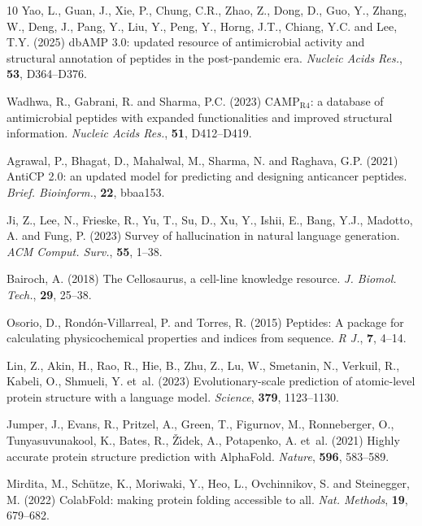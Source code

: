 \documentclass[unnumsec,webpdf,contemporary,large]{oup-authoring-template}%
\begin{document}
\begin{thebibliography}{10}
Yao, L., Guan, J., Xie, P., Chung, C.R., Zhao, Z., Dong, D., Guo, Y., Zhang, W., Deng, J., Pang, Y., Liu, Y., Peng, Y., Horng, J.T., Chiang, Y.C. and Lee, T.Y. (2025)
dbAMP 3.0: updated resource of antimicrobial activity and structural annotation of peptides in the post-pandemic era.
\newblock \emph{Nucleic Acids Res.}, \textbf{53}, D364--D376.

Wadhwa, R., Gabrani, R. and Sharma, P.C. (2023)
CAMP$_{\text{R4}}$: a database of antimicrobial peptides with expanded functionalities and improved structural information.
\newblock \emph{Nucleic Acids Res.}, \textbf{51}, D412--D419.

Agrawal, P., Bhagat, D., Mahalwal, M., Sharma, N. and Raghava, G.P. (2021)
AntiCP 2.0: an updated model for predicting and designing anticancer peptides.
\newblock \emph{Brief. Bioinform.}, \textbf{22}, bbaa153.

Ji, Z., Lee, N., Frieske, R., Yu, T., Su, D., Xu, Y., Ishii, E., Bang, Y.J., Madotto, A. and Fung, P. (2023)
Survey of hallucination in natural language generation.
\newblock \emph{ACM Comput. Surv.}, \textbf{55}, 1--38.

Bairoch, A. (2018)
The Cellosaurus, a cell-line knowledge resource.
\newblock \emph{J. Biomol. Tech.}, \textbf{29}, 25--38.

Osorio, D., Rond{\'o}n-Villarreal, P. and Torres, R. (2015)
Peptides: A package for calculating physicochemical properties and indices from sequence.
\newblock \emph{R J.}, \textbf{7}, 4--14.

Lin, Z., Akin, H., Rao, R., Hie, B., Zhu, Z., Lu, W., Smetanin, N., Verkuil, R., Kabeli, O., Shmueli, Y. et~al. (2023)
Evolutionary-scale prediction of atomic-level protein structure with a language model.
\newblock \emph{Science}, \textbf{379}, 1123--1130.

Jumper, J., Evans, R., Pritzel, A., Green, T., Figurnov, M., Ronneberger, O., Tunyasuvunakool, K., Bates, R., {\v{Z}}{\'\i}dek, A., Potapenko, A. et~al. (2021)
Highly accurate protein structure prediction with AlphaFold.
\newblock \emph{Nature}, \textbf{596}, 583--589.

Mirdita, M., Sch{\"u}tze, K., Moriwaki, Y., Heo, L., Ovchinnikov, S. and Steinegger, M. (2022)
ColabFold: making protein folding accessible to all.
\newblock \emph{Nat. Methods}, \textbf{19}, 679--682.


\end{thebibliography}
\end{document}
